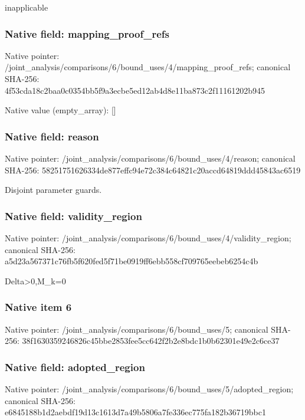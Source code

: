 \documentclass[10pt,a4paper]{article}
\begin{document}
\begingroup\raggedright\sloppy inapplicable\par\endgroup

\subsubsection{Native field: mapping\_\allowbreak{}proof\_\allowbreak{}refs}
Native pointer: /joint\_\allowbreak{}analysis/comparisons/6/bound\_\allowbreak{}uses/4/mapping\_\allowbreak{}proof\_\allowbreak{}refs; canonical SHA-256: 4f53cda18c2baa0c0354bb5f9a3ecbe5ed12ab4d8e11ba873c2f11161202b945

Native value (empty\_\allowbreak{}array): []

\subsubsection{Native field: reason}
Native pointer: /joint\_\allowbreak{}analysis/comparisons/6/bound\_\allowbreak{}uses/4/reason; canonical SHA-256: 58251751626334de877effc94e72c384c64821c20accd64819ddd45843ac6519

\begingroup\raggedright\sloppy Disjoint parameter guards.\par\endgroup

\subsubsection{Native field: validity\_\allowbreak{}region}
Native pointer: /joint\_\allowbreak{}analysis/comparisons/6/bound\_\allowbreak{}uses/4/validity\_\allowbreak{}region; canonical SHA-256: a5d23a567371c76fb5f620fed5f71be0919ff6ebb558cf709765eebeb6254c4b

\begingroup\raggedright\sloppy Delta>0,\allowbreak{}M\_\allowbreak{}k=\allowbreak{}0\par\endgroup

\subsubsection{Native item 6}
Native pointer: /joint\_\allowbreak{}analysis/comparisons/6/bound\_\allowbreak{}uses/5; canonical SHA-256: 38f1630359246826c45bbe2853fee5cc642f2b2e8bdc1b0b62301e49e2c6ce37

\subsubsection{Native field: adopted\_\allowbreak{}region}
Native pointer: /joint\_\allowbreak{}analysis/comparisons/6/bound\_\allowbreak{}uses/5/adopted\_\allowbreak{}region; canonical SHA-256: e6845188b1d2aebdf19d13c1613d7a49b5806a7fe336ec775fa182b36719bbc1
\end{document}
